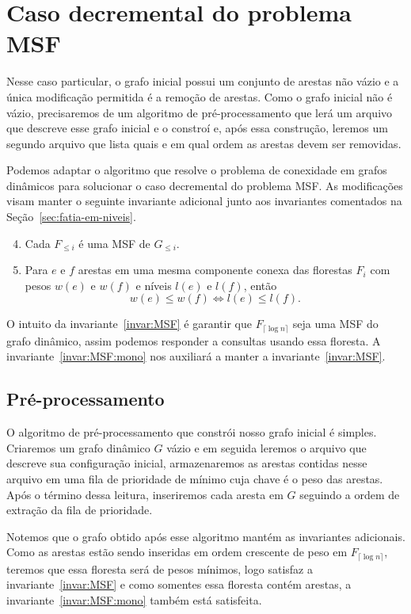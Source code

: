 \chapter{Caso decremental do problema MSF}

Nesse caso particular, o grafo inicial possui um conjunto de arestas não vázio e a única modificação permitida é a remoção de arestas. Como o grafo inicial não é vázio, precisaremos de um algoritmo de pré-processamento que lerá um arquivo que descreve esse grafo inicial e o constroí e, após essa construção, leremos um segundo arquivo que lista quais e em qual ordem as arestas devem ser removidas.

Podemos adaptar o algoritmo \HDT{} que resolve o problema de conexidade em grafos dinâmicos para solucionar o caso decremental do problema MSF.
As modificações visam manter o seguinte invariante adicional junto aos invariantes comentados na Seção~\ref{sec:fatia-em-niveis}.
\begin{enumerate}[label=(\roman*)]
    \setcounter{enumi}{3}
    \item Cada $F_{\leqslant i}$ é uma MSF de $G_{\leqslant i}$.\label{invar:MSF}
    \item Para $e$ e $f$ arestas em uma mesma componente conexa das florestas $F_i$ com pesos $w(e)$ e $w(f)$ e níveis $l(e)$ e $l(f)$, então\label{invar:MSF:mono}
	    $$w(e) \leq w(f) \iff l(e) \leq l(f).$$
\end{enumerate}

O intuito da invariante~\ref{invar:MSF} é garantir que $F_{\lceil \log n \rceil}$ seja uma MSF do grafo dinâmico, assim podemos responder a consultas usando essa floresta. A invariante~\ref{invar:MSF:mono} nos auxiliará a manter a invariante~\ref{invar:MSF}.

\section{Pré-processamento}


O algoritmo de pré-processamento que constrói nosso grafo inicial é simples.
Criaremos um grafo dinâmico $G$ vázio e em seguida leremos o arquivo que descreve sua configuração inicial, armazenaremos as arestas contidas nesse arquivo em uma fila de prioridade de mínimo cuja chave é o peso das arestas. 
Após o término dessa leitura, inseriremos cada aresta em $G$ seguindo a ordem de extração da fila de prioridade.

Notemos que o grafo obtido após esse algoritmo mantém as invariantes adicionais. Como as arestas estão sendo inseridas em ordem crescente de peso em $F_{\lceil \log n \rceil}$, teremos que essa floresta será de pesos mínimos, logo satisfaz a invariante~\ref{invar:MSF} e como somentes essa floresta contém arestas, a invariante~\ref{invar:MSF:mono} também está satisfeita.


